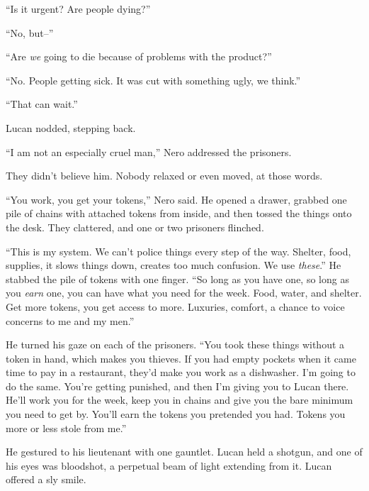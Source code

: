 ``Is it urgent?  Are people dying?''



``No, but--''



``Are \emph{we} going to die because of problems with the product?''



``No.  People getting sick.  It was cut with something ugly, we think.''



``That can wait.''



Lucan nodded, stepping back.



``I am not an especially cruel man,'' Nero addressed the prisoners.



They didn't believe him.  Nobody relaxed or even moved, at those words.



``You work, you get your tokens,'' Nero said.  He opened a drawer, grabbed one pile of chains with attached tokens from inside, and then tossed the things onto the desk.  They clattered, and one or two prisoners flinched.



``This is my system.  We can't police things every step of the way.  Shelter, food, supplies, it slows things down, creates too much confusion.  We use \emph{these}.''  He stabbed the pile of tokens with one finger.  ``So long as you have one, so long as you \emph{earn} one, you can have what you need for the week.  Food, water, and shelter.  Get more tokens, you get access to more.  Luxuries, comfort, a chance to voice concerns to me and my men.''



He turned his gaze on each of the prisoners.  ``You took these things without a token in hand, which makes you thieves.  If you had empty pockets when it came time to pay in a restaurant, they'd make you work as a dishwasher.  I'm going to do the same.  You're getting punished, and then I'm giving you to Lucan there.  He'll work you for the week, keep you in chains and give you the bare minimum you need to get by.  You'll earn the tokens you pretended you had.  Tokens you more or less stole from me.''



He gestured to his lieutenant with one gauntlet.  Lucan held a shotgun, and one of his eyes was bloodshot, a perpetual beam of light extending from it.  Lucan offered a sly smile.



